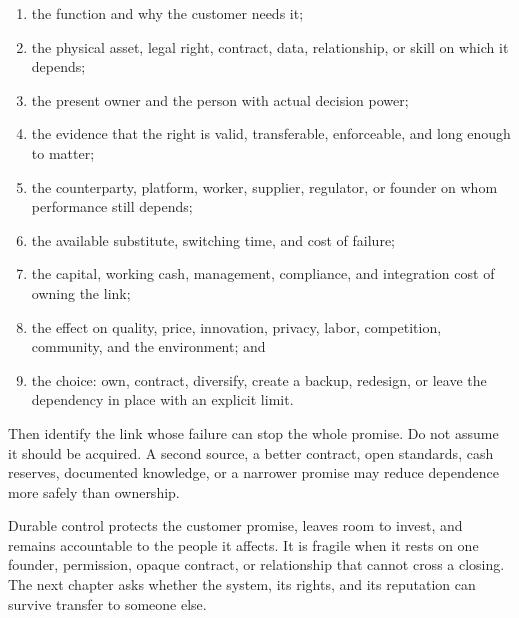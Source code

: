 \begin{enumerate}[itemsep=0em,topsep=0.25em]
\item the function and why the customer needs it;
\item the physical asset, legal right, contract, data, relationship, or skill
  on which it depends;
\item the present owner and the person with actual decision power;
\item the evidence that the right is valid, transferable, enforceable, and long
  enough to matter;
\item the counterparty, platform, worker, supplier, regulator, or founder on
  whom performance still depends;
\item the available substitute, switching time, and cost of failure;
\item the capital, working cash, management, compliance, and integration cost
  of owning the link;
\item the effect on quality, price, innovation, privacy, labor, competition,
  community, and the environment; and
\item the choice: own, contract, diversify, create a backup, redesign, or leave
  the dependency in place with an explicit limit.
\end{enumerate}

Then identify the link whose failure can stop the whole promise. Do not assume
it should be acquired. A second source, a better contract, open standards, cash
reserves, documented knowledge, or a narrower promise may reduce dependence
more safely than ownership.

Durable control protects the customer promise, leaves room to invest, and
remains accountable to the people it affects. It is fragile when it rests on
one founder, permission, opaque contract, or relationship that cannot cross a
closing. The next chapter asks whether the system, its rights, and its
reputation can survive transfer to someone else.
